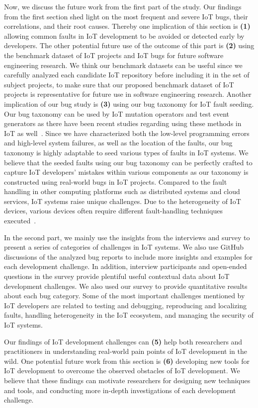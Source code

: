 Now, we discuss the future work from the first part of the study. Our findings from the first section shed light on the most frequent and severe IoT bugs, their correlations, and their root causes. Thereby one implication of this section is \textbf{(1)} allowing common faults in IoT development to be avoided or detected early by developers. The other potential future use of the outcome of this part is \textbf{(2)} using the benchmark dataset of IoT projects and IoT bugs for future software engineering research. We think our benchmark datasets can be useful since we carefully analyzed each candidate IoT repository before including it in the set of subject projects, to make sure that our proposed benchmark dataset of IoT projects is representative for future use in software engineering research. Another implication of our bug study is \textbf{(3)} using our bug taxonomy for IoT fault seeding. Our bug taxonomy can be used by IoT mutation operators and test event generators as there have been recent studies regarding using these methods in IoT as well~\cite{gutierrez2019evolutionary,gutierrez2018iot}. Since we have characterized both the low-level programming errors and high-level system failures, as well as the location of the faults, our bug taxonomy is highly adaptable to seed various types of faults in IoT systems. We believe that the seeded faults using our bug taxonomy can be perfectly crafted to capture IoT developers' mistakes within various components as our taxonomy is constructed using real-world bugs in IoT projects. Compared to the fault handling in other computing platforms such as distributed systems and cloud services, IoT systems raise unique challenges. Due to the heterogeneity of IoT devices, various devices often require different fault-handling techniques executed~\cite{norris2020iotrepair}.

In the second part, we mainly use the insights from the interviews and survey to present a series of categories of challenges in IoT systems. We also use GitHub discussions of the analyzed bug reports to include more insights and examples for each development challenge. In addition, interview participants and open-ended questions in the survey provide plentiful useful contextual data about IoT development challenges. We also used our survey to provide quantitative results about each bug category. Some of the most important challenges mentioned by IoT developers are related to testing and debugging, reproducing and localizing faults, handling heterogeneity in the IoT ecosystem, and managing the security of IoT systems. 

Our findings of IoT development challenges can \textbf{(5)} help both researchers and practitioners in understanding real-world pain points of IoT development in the wild. One potential future work from this section is \textbf{(6)} developing new tools for IoT development to overcome the observed obstacles of IoT development. We believe that these findings can motivate researchers for designing new techniques and tools, and conducting more in-depth investigations of each development challenge.

\endinput

